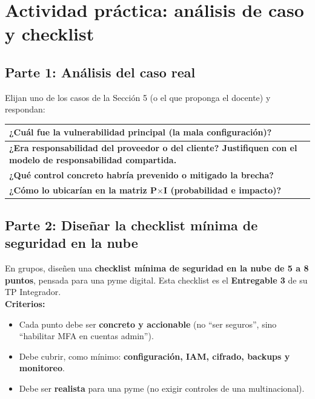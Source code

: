 \documentclass[12pt,a4paper]{article}
\renewcommand{\arraystretch}{1.25}
\begin{document}
\newpage
\section{Actividad pr\'actica: an\'alisis de caso y checklist}

\subsection{Parte 1: An\'alisis del caso real}

\begin{cajaActividad}[title={Analizando una brecha en la nube}]
Elijan uno de los casos de la Secci\'on 5 (o el que proponga el docente) y respondan:
\end{cajaActividad}

\vspace{4pt}
\renewcommand{\arraystretch}{1.6}
\begin{tabularx}{\textwidth}{|X|}
\hline
\textbf{¿Cu\'al fue la vulnerabilidad principal (la mala configuraci\'on)?} \\[1.8cm]
\hline
\textbf{¿Era responsabilidad del proveedor o del cliente? Justifiquen con el modelo de responsabilidad compartida.} \\[2cm]
\hline
\textbf{¿Qu\'e control concreto habr\'ia prevenido o mitigado la brecha?} \\[1.8cm]
\hline
\textbf{¿C\'omo lo ubicar\'ian en la matriz P$\times$I (probabilidad e impacto)?} \\[1.8cm]
\hline
\end{tabularx}

\newpage
\subsection{Parte 2: Dise\~nar la checklist m\'inima de seguridad en la nube}

\begin{cajaActividad}[title={Construyendo la checklist para una pyme digital}]
En grupos, dise\~nen una \textbf{checklist m\'inima de seguridad en la nube de 5 a 8 puntos}, pensada para una pyme digital. Esta checklist es el \textbf{Entregable 3} de su TP Integrador.\\[4pt]
\textbf{Criterios:}
\begin{itemize}[leftmargin=1.5em]
    \item Cada punto debe ser \textbf{concreto y accionable} (no ``ser seguros'', sino ``habilitar MFA en cuentas admin'').
    \item Debe cubrir, como m\'inimo: \textbf{configuraci\'on, IAM, cifrado, backups y monitoreo}.
    \item Debe ser \textbf{realista} para una pyme (no exigir controles de una multinacional).
\end{itemize}
\end{cajaActividad}
\end{document}
